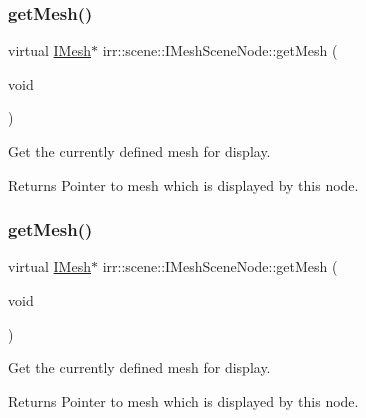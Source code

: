 \subsubsection{\texorpdfstring{get\+Mesh()}{getMesh()}\hspace{0.1cm}{\footnotesize\ttfamily [1/2]}}
{\footnotesize\ttfamily virtual \hyperlink{classirr_1_1scene_1_1IMesh}{I\+Mesh}$\ast$ irr\+::scene\+::\+I\+Mesh\+Scene\+Node\+::get\+Mesh (\begin{DoxyParamCaption}\item[{void}]{ }\end{DoxyParamCaption})\hspace{0.3cm}{\ttfamily [pure virtual]}}



Get the currently defined mesh for display. 

\begin{DoxyReturn}{Returns}
Pointer to mesh which is displayed by this node. 
\end{DoxyReturn}
\mbox{\label{classirr_1_1scene_1_1IMeshSceneNode_afe540de69bc3a058919cd5ce465be634}} 
\subsubsection{\texorpdfstring{get\+Mesh()}{getMesh()}\hspace{0.1cm}{\footnotesize\ttfamily [2/2]}}
{\footnotesize\ttfamily virtual \hyperlink{classirr_1_1scene_1_1IMesh}{I\+Mesh}$\ast$ irr\+::scene\+::\+I\+Mesh\+Scene\+Node\+::get\+Mesh (\begin{DoxyParamCaption}\item[{void}]{ }\end{DoxyParamCaption})\hspace{0.3cm}{\ttfamily [pure virtual]}}



Get the currently defined mesh for display. 

\begin{DoxyReturn}{Returns}
Pointer to mesh which is displayed by this node. 
\end{DoxyReturn}
\mbox{\label{classirr_1_1scene_1_1IMeshSceneNode_a1d7de4331b84480598f636c929418e3d}} 
